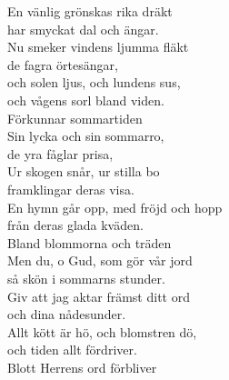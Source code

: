 \documentclass[a6paper, 10pt, twoside]{article}
\begin{document}
\noindent
\begin{center}
\end{center}
\begin{lyrics}
En vänlig grönskas rika dräkt\\
har smyckat dal och ängar.\\
Nu smeker vindens ljumma fläkt\\
de fagra örtesängar,\\
och solen ljus, och lundens sus,\\
och vågens sorl bland viden.\\
Förkunnar sommartiden
\vspace{5pt}\\
Sin lycka och sin sommarro,\\
de yra fåglar prisa,\\
Ur skogen snår, ur stilla bo\\
framklingar deras visa.\\
En hymn går opp, med fröjd och hopp\\
från deras glada kväden.\\
Bland blommorna och träden
\vspace{5pt}\\
Men du, o Gud, som gör vår jord\\
så skön i sommarns stunder.\\
Giv att jag aktar främst ditt ord\\
och dina nådesunder.\\
Allt kött är hö, och blomstren dö,\\
och tiden allt fördriver.\\
Blott Herrens ord förbliver
\end{lyrics}
\end{document}
